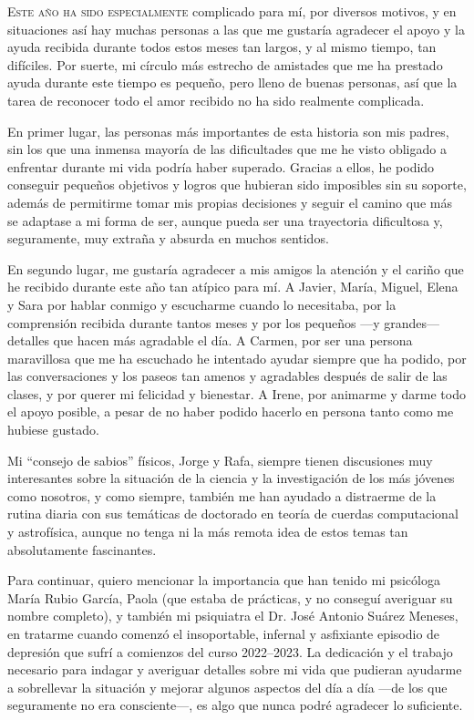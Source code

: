 \lettrine{E}{ste año ha sido especialmente} complicado para mí, por diversos motivos, y en situaciones así hay muchas personas a las que me gustaría agradecer el apoyo y la ayuda recibida durante todos estos meses tan largos, y al mismo tiempo, tan difíciles. Por suerte, mi círculo más estrecho de amistades que me ha prestado ayuda durante este tiempo es pequeño, pero lleno de buenas personas, así que la tarea de reconocer todo el amor recibido no ha sido realmente complicada. 

En primer lugar, las personas más importantes de esta historia son mis padres, sin los que una inmensa mayoría de las dificultades que me he visto obligado a enfrentar durante mi vida podría haber superado. Gracias a ellos, he podido conseguir pequeños objetivos y logros que hubieran sido imposibles sin su soporte, además de permitirme tomar mis propias decisiones y seguir el camino que más se adaptase a mi forma de ser, aunque pueda ser una trayectoria dificultosa y, seguramente, muy extraña y absurda en muchos sentidos.

En segundo lugar, me gustaría agradecer a mis amigos la atención y el cariño que he recibido durante este año tan atípico para mí. A Javier, María, Miguel, Elena y Sara por hablar conmigo y escucharme cuando lo necesitaba, por la comprensión recibida durante tantos meses y por los pequeños ---y grandes--- detalles que hacen más agradable el día. A Carmen, por ser una persona maravillosa que me ha escuchado he intentado ayudar siempre que ha podido, por las conversaciones y los paseos tan amenos y agradables después de salir de las clases, y por querer mi felicidad y bienestar. A Irene, por animarme y darme todo el apoyo posible, a pesar de no haber podido hacerlo en persona tanto como me hubiese gustado.

Mi \enquote{consejo de sabios} físicos, Jorge y Rafa, siempre tienen discusiones muy interesantes sobre la situación de la ciencia y la investigación de los más jóvenes como nosotros, y como siempre, también me han ayudado a distraerme de la rutina diaria con sus temáticas de doctorado en teoría de cuerdas computacional y astrofísica, aunque no tenga ni la más remota idea de estos temas tan absolutamente fascinantes. 

Para continuar, quiero mencionar la importancia que han tenido mi psicóloga María Rubio García, Paola (que estaba de prácticas, y no conseguí averiguar su nombre completo), y también mi psiquiatra el Dr. José Antonio Suárez Meneses, en tratarme cuando comenzó el insoportable, infernal y asfixiante episodio de depresión que sufrí a comienzos del curso \numrange{2022}{2023}. La dedicación y el trabajo necesario para indagar y averiguar detalles sobre mi vida que pudieran ayudarme a sobrellevar la situación y mejorar algunos aspectos del día a día ---de los que seguramente no era consciente---, es algo que nunca podré agradecer lo suficiente.


